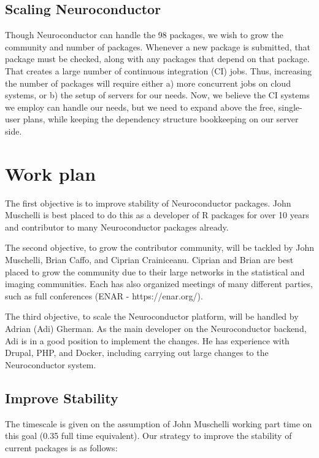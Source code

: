 \documentclass[]{elsarticle} %
\begin{document}
\subsection{Scaling Neuroconductor}\label{scaling-neuroconductor}

Though Neuroconductor can handle the 98 packages, we wish to grow the
community and number of packages. Whenever a new package is submitted,
that package must be checked, along with any packages that depend on
that package. That creates a large number of continuous integration (CI)
jobs. Thus, increasing the number of packages will require either a)
more concurrent jobs on cloud systems, or b) the setup of servers for
our needs. Now, we believe the CI systems we employ can handle our
needs, but we need to expand above the free, single-user plans, while
keeping the dependency structure bookkeeping on our server side.

\section{Work plan}\label{work-plan}

The first objective is to improve stability of Neuroconductor packages.
John Muschelli is best placed to do this as a developer of R packages
for over 10 years and contributor to many Neuroconductor packages
already.

The second objective, to grow the contributor community, will be tackled
by John Muschelli, Brian Caffo, and Ciprian Crainiceanu. Ciprian and
Brian are best placed to grow the community due to their large networks
in the statistical and imaging communities. Each has also organized
meetings of many different parties, such as full conferences (ENAR -
https://enar.org/).

The third objective, to scale the Neuroconductor platform, will be
handled by Adrian (Adi) Gherman. As the main developer on the
Neuroconductor backend, Adi is in a good position to implement the
changes. He has experience with Drupal, PHP, and Docker, including
carrying out large changes to the Neuroconductor system.

\subsection{Improve Stability}\label{improve-stability}

The timescale is given on the assumption of John Muschelli working part
time on this goal (0.35 full time equivalent). Our strategy to improve
the stability of current packages is as follows:
\end{document}

